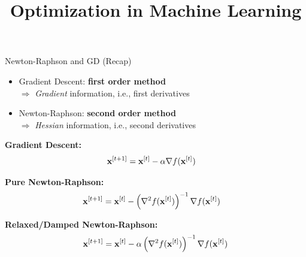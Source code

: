 \documentclass[11pt,compress,t,notes=noshow, xcolor=table]{beamer}
\title{Optimization in Machine Learning}
\begin{document}

\begin{vbframe}{Newton-Raphson and GD (Recap)}

\begin{itemize}
    \setlength{\itemsep}{0.6em}
    \item Gradient Descent: \textbf{first order method}\\
        $\Rightarrow$ \textit{Gradient} information, i.e., first derivatives 
    \item Newton-Raphson: \textbf{second order method}\\
        $\Rightarrow$ \textit{Hessian} information, i.e., second derivatives
\end{itemize}

\textbf{Gradient Descent:} 
\begin{align*}
\mathbf{x}^{[t+1]} &= \mathbf{x}^{[t]} - \alpha \nabla f(\mathbf{x}^{[t]})
\end{align*}


\textbf{Pure Newton-Raphson:} 
\begin{align*}
\mathbf{x}^{[t+1]} &= \mathbf{x}^{[t]} - \left(\nabla^2 f(\mathbf{x}^{[t]})\right)^{-1}\nabla f(\mathbf{x}^{[t]})
\end{align*}

\textbf{Relaxed/Damped Newton-Raphson:} 
\begin{equation*}
\mathbf{x}^{[t+1]} = \mathbf{x}^{[t]} -\alpha \left(\nabla^2 f(\mathbf{x}^{[t]})\right)^{-1}\nabla f(\mathbf{x}^{[t]})
\end{equation*}


\end{vbframe}
\end{document}
